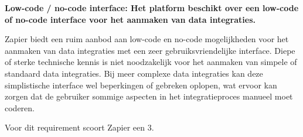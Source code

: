\textbf{Low-code / no-code interface: Het platform beschikt over een low-code of no-code interface voor het aanmaken van data integraties.}

\vspace{\baselineskip}

Zapier biedt een ruim aanbod aan low-code en no-code mogelijkheden voor het aanmaken van data integraties met een zeer gebruiksvriendelijke interface. Diepe of sterke technische kennis is niet noodzakelijk voor het aanmaken van simpele of standaard data integraties. Bij meer complexe data integraties kan deze simplistische interface wel beperkingen of gebreken oplopen, wat ervoor kan zorgen dat de gebruiker sommige aspecten in het integratieproces manueel moet coderen.

Voor dit requirement scoort Zapier een 3.


\newpage


